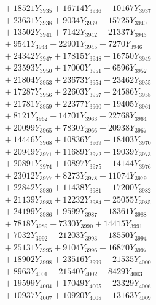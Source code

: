 \documentclass[a4paper,10pt]{article}
\begin{document}
{\begin{align}
&\;  + 18521 Y_{3935} + 16714 Y_{3936} + 10167 Y_{3937} \\[0.3ex]
&\;  + 23631 Y_{3938} + 9034 Y_{3939} + 15725 Y_{3940} \\[0.3ex]
&\;  + 13502 Y_{3941} + 7142 Y_{3942} + 21337 Y_{3943} \\[0.3ex]
&\;  + 9541 Y_{3944} + 22901 Y_{3945} + 7270 Y_{3946} \\[0.3ex]
&\;  + 24342 Y_{3947} + 17815 Y_{3948} + 16750 Y_{3949} \\[0.3ex]
&\;  + 23593 Y_{3950} + 17000 Y_{3951} + 6596 Y_{3952} \\[0.3ex]
&\;  + 21804 Y_{3953} + 23673 Y_{3954} + 23462 Y_{3955} \\[0.3ex]
&\;  + 17287 Y_{3956} + 22603 Y_{3957} + 24586 Y_{3958} \\[0.5ex]\allowbreak
&\;  + 21781 Y_{3959} + 22377 Y_{3960} + 19405 Y_{3961} \\[0.3ex]
&\;  + 8121 Y_{3962} + 14701 Y_{3963} + 22768 Y_{3964} \\[0.3ex]
&\;  + 20099 Y_{3965} + 7830 Y_{3966} + 20938 Y_{3967} \\[0.3ex]
&\;  + 14446 Y_{3968} + 10836 Y_{3969} + 18403 Y_{3970} \\[0.3ex]
&\;  + 20949 Y_{3971} + 11689 Y_{3972} + 19039 Y_{3973} \\[0.3ex]
&\;  + 20891 Y_{3974} + 10897 Y_{3975} + 14144 Y_{3976} \\[0.3ex]
&\;  + 23012 Y_{3977} + 8273 Y_{3978} + 11074 Y_{3979} \\[0.3ex]
&\;  + 22842 Y_{3980} + 11438 Y_{3981} + 17200 Y_{3982} \\[0.3ex]
&\;  + 21139 Y_{3983} + 12232 Y_{3984} + 25055 Y_{3985} \\[0.3ex]
&\;  + 24199 Y_{3986} + 9599 Y_{3987} + 18361 Y_{3988} \\[0.5ex]\allowbreak
&\;  + 7818 Y_{3989} + 7330 Y_{3990} + 14415 Y_{3991} \\[0.3ex]
&\;  + 7032 Y_{3992} + 21203 Y_{3993} + 18550 Y_{3994} \\[0.3ex]
&\;  + 25131 Y_{3995} + 9104 Y_{3996} + 16870 Y_{3997} \\[0.3ex]
&\;  + 18902 Y_{3998} + 23516 Y_{3999} + 21535 Y_{4000} \\[0.3ex]
&\;  + 8963 Y_{4001} + 21540 Y_{4002} + 8429 Y_{4003} \\[0.3ex]
&\;  + 19599 Y_{4004} + 17049 Y_{4005} + 23329 Y_{4006} \\[0.3ex]
&\;  + 10937 Y_{4007} + 10920 Y_{4008} + 13163 Y_{4009} \\[0.3ex]

\end{align}}
\end{document}
